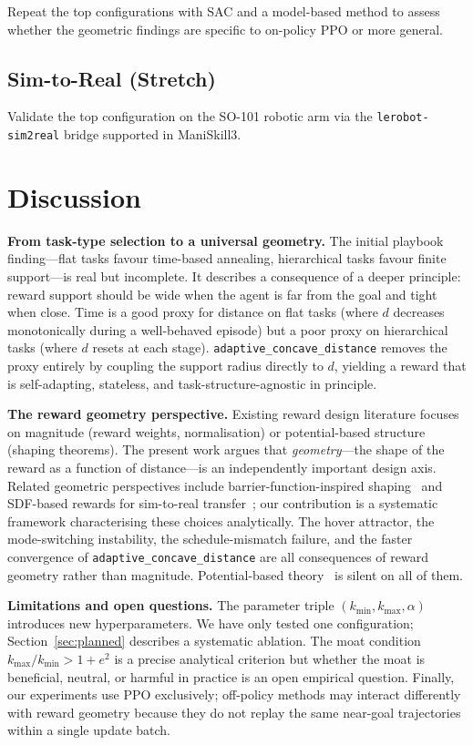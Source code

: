 \documentclass{article}
\begin{document}
Repeat the top configurations with SAC and a model-based method to assess whether
the geometric findings are specific to on-policy PPO or more general.

\subsection{Sim-to-Real (Stretch)}

Validate the top configuration on the SO-101 robotic arm via the
\texttt{lerobot-sim2real} bridge supported in ManiSkill3.

\section{Discussion}
\label{sec:discussion}

\textbf{From task-type selection to a universal geometry.}
The initial playbook finding---flat tasks favour time-based annealing, hierarchical
tasks favour finite support---is real but incomplete. It describes a consequence of
a deeper principle: reward support should be wide when the agent is far from the goal
and tight when close. Time is a good proxy for distance on flat tasks (where $d$
decreases monotonically during a well-behaved episode) but a poor proxy on hierarchical
tasks (where $d$ resets at each stage). \texttt{adaptive\_concave\_distance} removes
the proxy entirely by coupling the support radius directly to $d$, yielding a reward
that is self-adapting, stateless, and task-structure-agnostic in principle.

\textbf{The reward geometry perspective.}
Existing reward design literature focuses on magnitude (reward weights, normalisation)
or potential-based structure (shaping theorems). The present work argues that
\emph{geometry}---the shape of the reward as a function of distance---is an
independently important design axis. Related geometric perspectives include
barrier-function-inspired shaping~\citep{nilaksh2024barrier} and SDF-based rewards
for sim-to-real transfer~\citep{tang2023industreal}; our contribution is a systematic
framework characterising these choices analytically. The hover attractor, the mode-switching instability,
the schedule-mismatch failure, and the faster convergence of
\texttt{adaptive\_concave\_distance} are all consequences of reward geometry rather
than magnitude. Potential-based theory~\citep{ng1999shaping} is silent on all of them.

\textbf{Limitations and open questions.}
The parameter triple $(k_{\min}, k_{\max}, \alpha)$ introduces new hyperparameters.
We have only tested one configuration; Section~\ref{sec:planned} describes a systematic
ablation. The moat condition $k_{\max}/k_{\min} > 1+e^2$ is a precise analytical
criterion but whether the moat is beneficial, neutral, or harmful in practice is an
open empirical question. Finally, our experiments use PPO exclusively; off-policy
methods may interact differently with reward geometry because they do not replay the
same near-goal trajectories within a single update batch.
\end{document}
